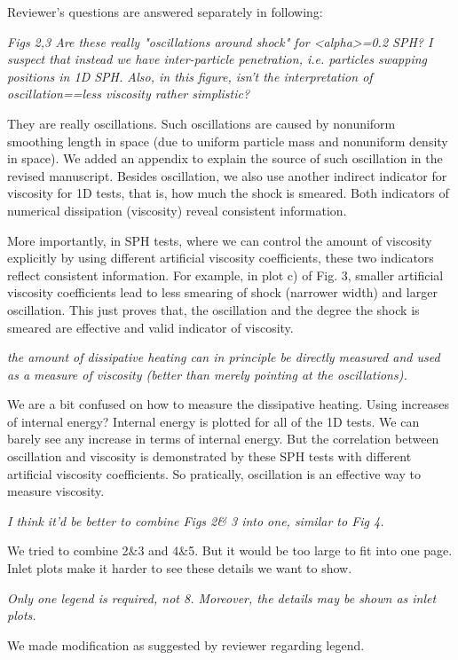 \documentclass[10pt,a4paper]{article}
\begin{document}
Reviewer's questions are answered separately in following: 

\textit{Figs 2,3 Are these really "oscillations around shock" for <alpha>=0.2 SPH? I suspect that instead we have inter-particle penetration, i.e.
particles swapping positions in 1D SPH. Also, in this figure, isn't the interpretation of oscillation==less viscosity rather simplistic? }

They are really oscillations. Such oscillations are caused by nonuniform smoothing length in space (due to uniform particle mass and nonuniform density in space). We added an appendix to explain the source of such oscillation in the revised manuscript.
Besides oscillation, we also use another indirect indicator for viscosity for 1D tests, that is, how much the shock is smeared. Both indicators of numerical dissipation (viscosity) reveal consistent information. 

More importantly, in SPH tests, where we can control the amount of viscosity explicitly by using different artificial viscosity coefficients, these two indicators reflect consistent information. For example, in plot c) of Fig. 3, smaller artificial viscosity coefficients lead to less smearing of shock (narrower width) and larger oscillation. This just proves that, the oscillation and the degree the shock is smeared are effective and valid indicator of viscosity.

\textit{the amount of dissipative heating can in principle be directly measured and used as a measure of viscosity (better than merely pointing at the oscillations).}  

We are a bit confused on how to measure the dissipative heating. Using increases of internal energy? Internal energy is plotted for all of the 1D tests. We can barely see any increase in terms of internal energy. But the correlation between oscillation and viscosity is demonstrated by these SPH tests with different artificial viscosity coefficients. So pratically, oscillation is an effective way to measure viscosity.

\textit{I think it'd be better to combine Figs 2\& 3 into one, similar to Fig 4.}

We tried to combine 2\&3 and 4\&5. But it would be too large to fit into one page. Inlet plots make it harder to see these details we want to show.

\textit{Only one legend is required, not 8. Moreover, the details may be shown as inlet plots.} 

We made modification as suggested by reviewer regarding legend.
\\[3pt]
\end{document}

